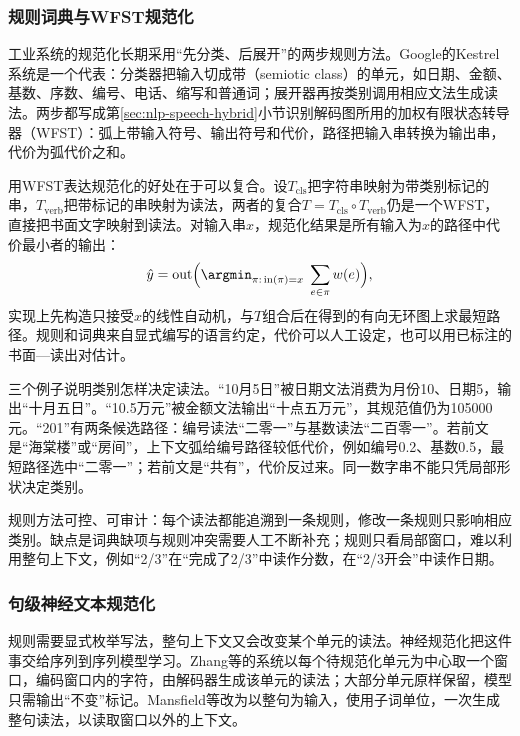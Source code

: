 \subsubsection{规则词典与WFST规范化}
\label{sec:nlp-speech-wfst-normalization}

工业系统的规范化长期采用“先分类、后展开”的两步规则方法。Google的Kestrel系统是一个代表：分类器把输入切成带（semiotic class）的单元，如日期、金额、基数、序数、编号、电话、缩写和普通词；展开器再按类别调用相应文法生成读法。两步都写成第\ref{sec:nlp-speech-hybrid}小节识别解码图所用的加权有限状态转导器（WFST）：弧上带输入符号、输出符号和代价，路径把输入串转换为输出串，代价为弧代价之和。

用WFST表达规范化的好处在于可以复合。设$T_{\mathrm{cls}}$把字符串映射为带类别标记的串，$T_{\mathrm{verb}}$把带标记的串映射为读法，两者的复合$T=T_{\mathrm{cls}}\circ T_{\mathrm{verb}}$仍是一个WFST，直接把书面文字映射到读法。对输入串$x$，规范化结果是所有输入为$x$的路径中代价最小者的输出：
\begin{equation}
  \hat y=\operatorname{out}\Bigl(\argmin_{\pi:\,\operatorname{in}(\pi)=x}\;\sum_{e\in\pi}w(e)\Bigr),
  \label{eq:nlp-speech-wfst}
\end{equation}
实现上先构造只接受$x$的线性自动机，与$T$组合后在得到的有向无环图上求最短路径。规则和词典来自显式编写的语言约定，代价可以人工设定，也可以用已标注的书面—读出对估计。

三个例子说明类别怎样决定读法。“10月5日”被日期文法消费为月份10、日期5，输出“十月五日”。“10.5万元”被金额文法输出“十点五万元”，其规范值仍为105000元。“201”有两条候选路径：编号读法“二零一”与基数读法“二百零一”。若前文是“海棠楼”或“房间”，上下文弧给编号路径较低代价，例如编号0.2、基数0.5，最短路径选中“二零一”；若前文是“共有”，代价反过来。同一数字串不能只凭局部形状决定类别。

规则方法可控、可审计：每个读法都能追溯到一条规则，修改一条规则只影响相应类别。缺点是词典缺项与规则冲突需要人工不断补充；规则只看局部窗口，难以利用整句上下文，例如“2/3”在“完成了2/3”中读作分数，在“2/3开会”中读作日期。

\subsubsection{句级神经文本规范化}
\label{sec:nlp-speech-neural-normalization}

规则需要显式枚举写法，整句上下文又会改变某个单元的读法。神经规范化把这件事交给序列到序列模型学习。Zhang等的系统以每个待规范化单元为中心取一个窗口，编码窗口内的字符，由解码器生成该单元的读法；大部分单元原样保留，模型只需输出“不变”标记。Mansfield等改为以整句为输入，使用子词单位，一次生成整句读法，以读取窗口以外的上下文。

